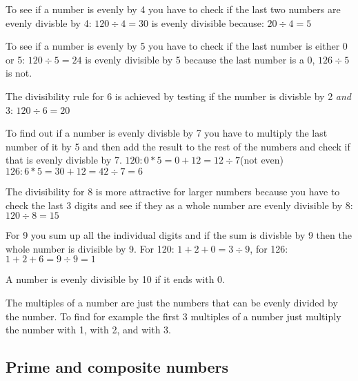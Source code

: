 \documentclass{article}
\begin{document}
To see if a number is evenly by 4 you have to check if the last two numbers are evenly divisble by 4: $120\div4=30$ is evenly divisible because: $20\div4=5$ 

To see if a number is evenly by 5 you have to check if the last number is either 0 or 5: $120\div5=24$ is evenly divisible by 5 because the last number is a 0, $126\div5$ is not.

The divisibility rule for 6 is achieved by testing if the number is divisble by 2 \emph{and} 3: $120\div6=20$

To find out if a number is evenly divisble by 7 you have to multiply the last number of it by 5 and then add the result to the rest of the numbers and check if that is evenly divisble by 7. $120: 0*5=0+12=12\div{7}$\lightning(not even)
$126: 6*5=30+12=42\div{7}=6$\checkmark

The divisibility for 8 is more attractive for larger numbers because you have to check the last 3 digits and see if they as a whole number are evenly divisible by 8: $120\div{8}=15$\checkmark

For 9 you sum up all the individual digits and if the sum is divisble by 9 then the whole number is divisible by 9. For 120: $1+2+0=3\div{9}$\lightning, for 126: $1+2+6=9\div{9}=1$\checkmark

A number is evenly divisible by 10 if it ends with 0.
\par

The multiples of a number are just the numbers that can be evenly divided by the number. To find for example the first 3 multiples of a number just multiply the number with 1, with 2, and with 3.

\subsection{Prime and composite numbers}




  
\end{document}
